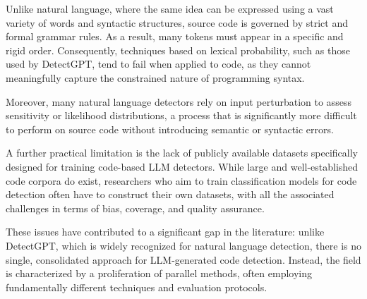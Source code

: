 Unlike natural language, where the same idea 
can be expressed using a vast variety of words 
and syntactic structures, source code is governed 
by strict and formal grammar rules. As a result, 
many tokens must appear in a specific and rigid 
order. Consequently, techniques based on lexical 
probability, such as those used by DetectGPT, 
tend to fail when applied to code, as they cannot 
meaningfully capture the constrained nature of 
programming syntax.

Moreover, many natural language detectors 
rely on input perturbation to assess sensitivity 
or likelihood distributions, a process that is 
significantly more difficult to perform on source 
code without introducing semantic or syntactic errors.

A further practical limitation is the lack of 
publicly available datasets specifically designed 
for training code-based LLM detectors. While large 
and well-established code corpora do exist, 
researchers who aim to train classification models 
for code detection often have to construct their 
own datasets, with all the associated challenges 
in terms of bias, coverage, and quality assurance.

These issues have contributed to a significant 
gap in the literature: unlike DetectGPT, which is 
widely recognized for natural language detection, 
there is no single, consolidated approach for 
LLM-generated code detection. Instead, the field 
is characterized by a proliferation of parallel 
methods, often employing fundamentally different 
techniques and evaluation protocols.



